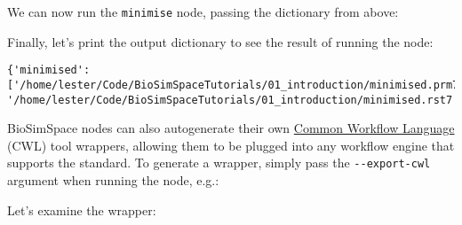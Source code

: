 We can now run the \texttt{minimise} node, passing the dictionary from
above:

\begin{Shaded}
\begin{Highlighting}[]
\OperatorTok{=}\NormalTok{, }\NormalTok{)}
\end{Highlighting}
\end{Shaded}

Finally, let's print the output dictionary to see the result of running
the node:

\begin{Shaded}
\begin{Highlighting}[]
\end{Highlighting}
\end{Shaded}

\begin{verbatim}
{'minimised': ['/home/lester/Code/BioSimSpaceTutorials/01_introduction/minimised.prm7', '/home/lester/Code/BioSimSpaceTutorials/01_introduction/minimised.rst7']}
\end{verbatim}

BioSimSpace nodes can also autogenerate their own
\href{https://www.commonwl.org/}{Common Workflow Language} (CWL) tool
wrappers, allowing them to be plugged into any workflow engine that
supports the standard. To generate a wrapper, simply pass the
\texttt{-\/-export-cwl} argument when running the node, e.g.:

\begin{Shaded}
\begin{Highlighting}[]
\OperatorTok{/}\OperatorTok{--}\OperatorTok{-}
\end{Highlighting}
\end{Shaded}

Let's examine the wrapper:

\begin{Shaded}
\begin{Highlighting}[]
\OperatorTok{/}
\end{Highlighting}
\end{Shaded}

